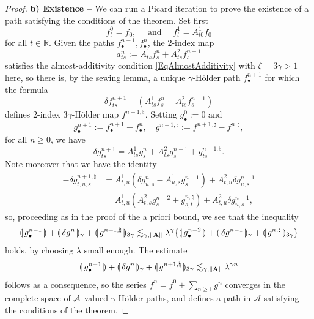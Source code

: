 \documentclass[11pt,a4paper]{amsart}
\newcommand{\RR}{\mathbb{R}}  \newcommand{\CC}{\mathbb{C}}  \newcommand{\LL}{\mathbb{L}}  \newcommand{\WW}{\mathbb{W}}
\renewcommand{\geq}{\geqslant}
\theoremstyle{plain}%
\theoremstyle{definition}
\theoremstyle{remark}
\numberwithin{equation}{section} %
\begin{document}
\begin{proof}
{\bf b) Existence --} We can run a Picard iteration to prove the existence of a path satisfying the conditions of the theorem. Set first
$$
f^0_t = f_0,\quad \textrm{ and } \quad f^1_t =A^1_{t0} f_0
$$ 
for all $t \in \RR$. Given the paths $f^{n-1}_\bullet, f^n_\bullet$, the $2$-index map 
$$
a^n_{ts} := A^1_{ts} f^n_s +A^2_{ts} f_s^{n - 1}
$$
satisfies the almost-additivity condition \eqref{EqAlmostAdditivity} with $\zeta=3\gamma>1$ here, so there is, by the sewing lemma, a unique $\gamma$-H\"older path $f^{n + 1}_\bullet$ for which the formula
$$ 
\delta f^{n + 1}_{ts} - (A^1_{ts} f^n_s +A^2_{ts} f_s^{n - 1}) 
$$
defines $2$-index $3\gamma$-H\"older map $f^{n + 1, \natural}$. Setting $g^0_\bullet := 0$ and
$$
g^{n + 1}_\bullet := f^{n + 1}_\bullet - f^n_\bullet, \quad  g^{n + 1, \natural} := f^{n + 1, \natural} - f^{n, \natural},
$$ 
for all $n \geq 0$, we have
$$
\delta g^{n + 1}_{ts} =A^1_{ts} g^n_s +A^2_{ts} g_s^{n - 1} + g^{n + 1, \natural}_{ts}. 
$$
Note moreover that we have the identity
\begin{equation*}
\begin{split}
- \delta g^{n + 1, \natural}_{t, u, s} &= A^1_{t, u} (\delta  g^n_{u, s} -A^1_{u, s} g^{n - 1}_s) +A^2_{t, u} \delta g^{n - 1}_{u, s} \\
&= A^1_{t, u} (A^2_{t, s} g^{n - 2}_s + g^{n, \natural}_{s, t}) +A^2_{t, u} \delta g^{n - 1}_{u, s},
\end{split}
\end{equation*}
so, proceeding as in the proof of the a priori bound, we see that the inequality
$$
\llparenthesis\, g^{n - 1}_\bullet\,\rrparenthesis + \llparenthesis\, \delta g^n \,\rrparenthesis_\gamma + \llparenthesis\, g^{n + 1, \natural} \,\rrparenthesis_{3 \gamma} \lesssim_{\gamma, \| {\bf A} \|} \lambda^\gamma \{\llparenthesis\, g^{n - 2}_\bullet \,\rrparenthesis + \llparenthesis\, \delta g^{n - 1} \,\rrparenthesis_\gamma + \llparenthesis\, g^{n, \natural} \,\rrparenthesis_{3 \gamma}\}
$$  
holds, by choosing $\lambda$ small enough. The estimate
$$
\llparenthesis\, g^{n - 1}_\bullet\,\rrparenthesis + \llparenthesis\, \delta g^n \,\rrparenthesis_\gamma + \llparenthesis\, g^{n + 1, \natural} \,\rrparenthesis_{3 \gamma} \lesssim_{\gamma, \| {\bf A} \|} \lambda^{\gamma n}
$$
follows as a consequence, so the series $f^n = f^0 + \sum_{n \geqslant 1} g^n$ converges in the complete space of $\mathcal{A}$-valued $\gamma$-H\"older paths, and defines a path in $\mathcal{A}$ satisfying the conditions of the theorem.
\end{proof}
\end{document}
